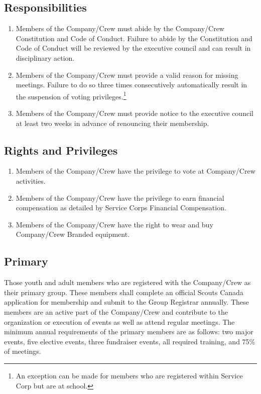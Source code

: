 \documentclass{Service_Corps_Document}
\begin{document}
\subsection{Responsibilities}
\begin{enumerate}
	\item Members of the Company/Crew must abide by the Company/Crew Constitution and Code of Conduct.
	Failure to abide by the Constitution and Code of Conduct will be reviewed by the executive council and can result in disciplinary action.
	\item Members of the Company/Crew must provide a valid reason for missing meetings.
	Failure to do so three times consecutively automatically result in the suspension of voting privileges.\footnote{An exception can be made for members who are registered within Service Corp but are at school.}
	\item Members of the Company/Crew must provide notice to the executive council at least two weeks in advance of renouncing their membership.
\end{enumerate}
\subsection{Rights and Privileges}
\begin{enumerate}
	\item Members of the Company/Crew have the privilege to vote at Company/Crew activities.
	\item Members of the Company/Crew have the privilege to earn financial compensation as detailed by Service Corps Financial Compensation.
	\item Members of the Company/Crew have the right to wear and buy Company/Crew Branded equipment.
\end{enumerate}
\subsection{Primary}
Those youth and adult members who are registered with the Company/Crew as their primary group.
These members shall complete an official Scouts Canada application for membership and submit to the Group Registrar annually.
These members are an active part of the Company/Crew and contribute to the organization or execution of events as well as attend regular meetings.
The minimum annual requirements of the primary members are as follows: two major events, five elective events, three fundraiser events, all required training, and 75\% of meetings.
\end{document}
